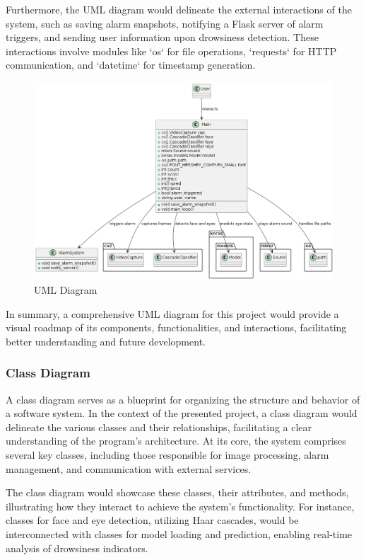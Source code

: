 \documentclass[12pt]{article}
\begin{document}
Furthermore, the UML diagram would delineate the external interactions of the system, such as saving alarm snapshots, notifying a Flask server of alarm triggers, and sending user information upon drowsiness detection. These interactions involve modules like `os` for file operations, `requests` for HTTP communication, and `datetime` for timestamp generation.

\begin{figure}[h]
\centering
\includegraphics[width=1.0\textwidth]{UML}
\caption{UML Diagram}
\end{figure}
\FloatBarrier

In summary, a comprehensive UML diagram for this project would provide a visual roadmap of its components, functionalities, and interactions, facilitating better understanding and future development.



\subsubsection{Class Diagram}
A class diagram serves as a blueprint for organizing the structure and behavior of a software system. In the context of the presented project, a class diagram would delineate the various classes and their relationships, facilitating a clear understanding of the program's architecture. At its core, the system comprises several key classes, including those responsible for image processing, alarm management, and communication with external services.

The class diagram would showcase these classes, their attributes, and methods, illustrating how they interact to achieve the system's functionality. For instance, classes for face and eye detection, utilizing Haar cascades, would be interconnected with classes for model loading and prediction, enabling real-time analysis of drowsiness indicators.
\end{document}
